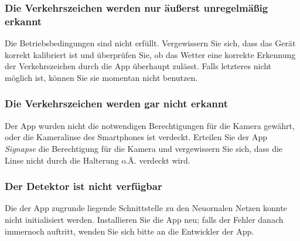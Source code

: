 \documentclass[12pt,a4paper,ngerman,enabledeprecatedfontcommands]{article}
\begin{document}
\subsubsection*{Die Verkehrszeichen werden nur äußerst unregelmäßig erkannt}
Die Betriebsbedingungen sind nicht erfüllt. Vergewissern Sie sich, dass das Gerät korrekt kalibriert ist und überprüfen Sie, ob das Wetter eine korrekte Erkennung der Verkehrszeichen durch die App überhaupt zulässt. Falls letzteres nicht möglich ist, können Sie sie momentan nicht benutzen.

\subsubsection*{Die Verkehrszeichen werden gar nicht erkannt}
Der App wurden nicht die notwendigen Berechtigungen für die Kamera gewährt, oder die Kameralinse des Smartphones ist verdeckt. Erteilen Sie der App \textit{Signapse} die Berechtigung für die Kamera und vergewissern Sie sich, dass die Linse nicht durch die Halterung o.Ä. verdeckt wird.

\subsubsection*{Der Detektor ist nicht verfügbar}
Die der App zugrunde liegende Schnittstelle zu den Neuornalen Netzen konnte nicht initialisiert werden. Installieren Sie die App neu; falls der Fehler danach immernoch auftritt, wenden Sie sich bitte an die Entwickler der App.
\end{document}
